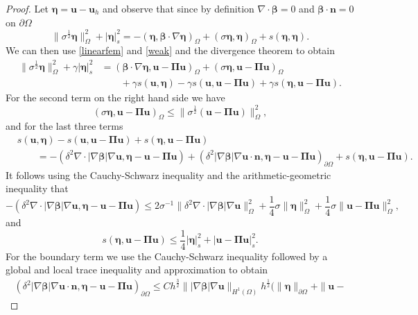 \documentclass[10pt]{amsart}
\numberwithin{equation}{section}
\theoremstyle{definition}
\theoremstyle{remark}
\renewcommand{\(}{\bigl(}
\renewcommand{\)}{\bigr)}
\newcommand{\bld}[1]{\boldsymbol{#1}}
\newcommand{\bn}{\bld{n}}
\newcommand{\bu}{\bld{u}}
\newcommand{\bldeta}{\bld{\eta}}
\newcommand{\bPi}{\bld{\Pi}}
\newcommand{\bbeta}{{\bm \beta}}
\begin{document}
\begin{proof}
Let $\bldeta= \bu-\bu_h$ and observe that since by definition $\nabla \cdot \bbeta = 0$ and $\bbeta \cdot \bn =
0$ on $\partial \Omega$
\[
\|\sigma^{\frac12} \bldeta\|^2_\Omega + |\bldeta|_s^2=-(\bldeta, \bbeta
\cdot \nabla \bldeta)_\Omega+(\sigma \bldeta, \bldeta)_\Omega+ s(\bldeta,\bldeta).
\]
We can then
use \eqref{linearfem} and \eqref{weak} and the
divergence theorem to
obtain
\begin{align}\label{eq:lin_pert}
\|\sigma^{\frac12} \bldeta\|^2_\Omega + \gamma |\bldeta|_s^2 
&=(\bbeta \cdot \nabla\bldeta, \bu -
\bPi \bu)_\Omega+(\sigma \bldeta, \bu -
\bPi \bu)_\Omega 
\\ \nonumber
&\qquad 
+\gamma  s(\bu,\bldeta)- \gamma s(\bu,\bu -
\bPi \bu)+\gamma s(\bldeta,\bu -\bPi \bu).
\end{align}
For the second term on the right hand side we have 
\begin{equation}\label{eq:reac_term}
(\sigma \bldeta, \bu -
\bPi \bu)_\Omega \leq \|\sigma^{\frac12}(\bu -
\bPi \bu)\|^2_\Omega,
\end{equation}
and for the last three terms
\begin{align*}
& s(\bu,\bldeta)-s(\bu,\bu -
\bPi \bu)+s(\bldeta,\bu -\bPi \bu) 
\\
&\qquad  = -(\delta^2 \nabla \cdot |\nabla
\bbeta| \nabla \bu, \bldeta - \bu -
\bPi \bu) + (\delta^2 |\nabla
\bbeta| \nabla \bu\cdot \bn, \bldeta - \bu -
\bPi \bu)_{\partial \Omega} +s(\bldeta,\bu -\bPi \bu).
\end{align*}
It follows using the Cauchy-Schwarz inequality and the
arithmetic-geometric inequality that
\begin{equation}\label{eq:smag_term}
 -(\delta^2 \nabla \cdot |\nabla
\bbeta| \nabla \bu, \bldeta - \bu -
\bPi \bu) \leq 2 \sigma^{-1}  \|\delta^2 \nabla \cdot |\nabla
\bbeta| \nabla \bu\|_\Omega^2 + \frac14 \sigma \|\bldeta\|^2_\Omega +
\frac14 \sigma \| \bu -
\bPi \bu\|^2_\Omega,
\end{equation}
and
\begin{equation}\label{eq:stab_term}
s(\bldeta,\bu -\bPi \bu) \leq \frac14 |\bldeta|_s^2 + |\bu - \bPi
\bu|_s^2.
\end{equation}
For the boundary term we use the Cauchy-Schwarz inequality followed by
a global and local trace inequality and approximation to obtain
\begin{multline*}
(\delta^2 |\nabla
\bbeta| \nabla \bu\cdot \bn, \bldeta - \bu -
\bPi \bu)_{\partial \Omega} \leq C  h^{\frac32} \||\nabla
\bbeta| \nabla \bu\|_{H^1(\Omega)} h^{\frac12}(\| \bldeta\|_{\partial \Omega} + \|\bu -

\end{multline*}
\end{proof}
\end{document}
